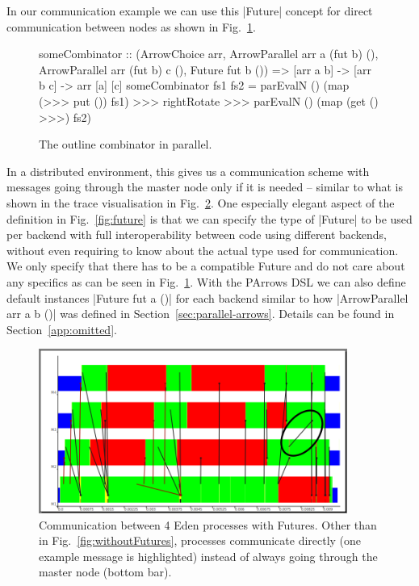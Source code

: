 In our communication example we can use this |Future| concept for direct communication between nodes as shown in Fig.~\ref{fig:someCombinatorParallel}.
\begin{figure}[t]
\begin{code}
someCombinator :: (ArrowChoice arr,
	ArrowParallel arr a (fut b) (), 
	ArrowParallel arr (fut b) c (),
	Future fut b ()) =>
	[arr a b] -> [arr b c] -> arr [a] [c]
someCombinator fs1 fs2 =
	parEvalN () (map (>>> put ()) fs1) >>>
	rightRotate >>>
	parEvalN () (map (get () >>>) fs2)
\end{code}
\caption{The outline combinator in parallel.}
\label{fig:someCombinatorParallel}
\end{figure}
In a distributed environment, this gives us a communication scheme with messages going through the master node only if it is needed -- similar to what is shown in the trace visualisation in Fig.~\ref{fig:withFutures}. One especially elegant aspect of the definition in Fig.~\ref{fig:future} is that we can specify the type of |Future| to be used per backend with full interoperability between code using different backends, without even requiring to know about the actual type used for communication. We only specify that there has to be a compatible Future and do not care about any specifics as can be seen in Fig.~\ref{fig:someCombinatorParallel}. With the PArrows DSL we can also define default instances |Future fut a ()| for each backend similar to how |ArrowParallel arr a b ()| was defined in Section~\ref{sec:parallel-arrows}. Details can be found in Section~\ref{app:omitted}. 
\begin{figure}[ht]
	\centering
	\includegraphics[width=0.9\textwidth]{images/withFutures}
	\caption[with Futures]{Communication between 4 Eden processes with Futures. Other than in Fig.~\ref{fig:withoutFutures}, processes communicate directly (one example message is highlighted) instead of always going through the master node (bottom bar).}
	\label{fig:withFutures}
\end{figure}
